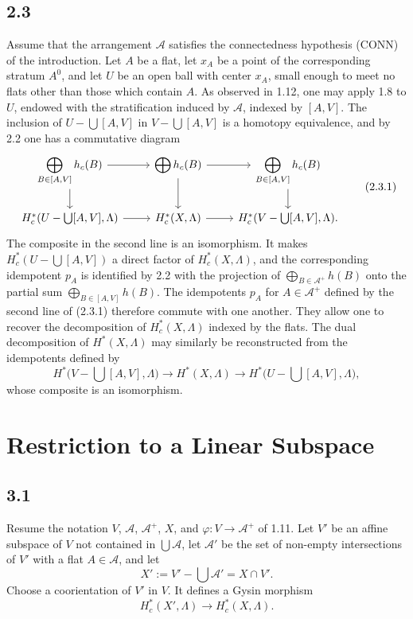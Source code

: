 \documentclass[11pt]{article}
\theoremstyle{definition}
\begin{document}
\subsection*{2.3}
Assume that the arrangement $\mathcal A$ satisfies the connectedness hypothesis \textup{(CONN)} of the introduction.  Let $A$ be a flat, let $x_A$ be a point of the corresponding stratum $A^0$, and let $U$ be an open ball with center $x_A$, small enough to meet no flats other than those which contain $A$.  As observed in 1.12, one may apply 1.8 to $U$, endowed with the stratification induced by $\mathcal A$, indexed by $[A,V]$.  The inclusion of $U-\bigcup[A,V]$ in $V-\bigcup[A,V]$ is a homotopy equivalence, and by 2.2 one has a commutative diagram
\begin{equation}
\begin{tikzcd}
\displaystyle\bigoplus_{B\in[A,V]}h_c(B) \arrow[r] \arrow[d] & \displaystyle\bigoplus h_c(B) \arrow[r] \arrow[d] & \displaystyle\bigoplus_{B\in[A,V]}h_c(B) \arrow[d]\\
H_c^*(U-\bigcup[A,V],\Lambda) \arrow[r] & H_c^*(X,\Lambda) \arrow[r] & H_c^*(V-\bigcup[A,V],\Lambda).
\end{tikzcd}\tag{2.3.1}
\end{equation}
The composite in the second line is an isomorphism.  It makes $H_c^*(U-\bigcup[A,V])$ a direct factor of $H_c^*(X,\Lambda)$, and the corresponding idempotent $p_A$ is identified by 2.2 with the projection of $\bigoplus_{B\in\mathcal A^+}h(B)$ onto the partial sum $\bigoplus_{B\in[A,V]}h(B)$.  The idempotents $p_A$ for $A\in\mathcal A^+$ defined by the second line of (2.3.1) therefore commute with one another.  They allow one to recover the decomposition of $H_c^*(X,\Lambda)$ indexed by the flats.  The dual decomposition of $H^*(X,\Lambda)$ may similarly be reconstructed from the idempotents defined by
\[
H^*\bigl(V-\bigcup[A,V],\Lambda\bigr)\longrightarrow H^*(X,\Lambda)\longrightarrow H^*\bigl(U-\bigcup[A,V],\Lambda\bigr),
\]
whose composite is an isomorphism.

\section{Restriction to a Linear Subspace}

\subsection*{3.1}
Resume the notation $V$, $\mathcal A$, $\mathcal A^+$, $X$, and $\varphi:V\to\mathcal A^+$ of 1.11.  Let $V'$ be an affine subspace of $V$ not contained in $\bigcup\mathcal A$, let $\mathcal A'$ be the set of non-empty intersections of $V'$ with a flat $A\in\mathcal A$, and let
\[
X':=V'-\bigcup\mathcal A'=X\cap V'.
\]
Choose a coorientation of $V'$ in $V$.  It defines a Gysin morphism
\begin{equation}
H_c^*(X',\Lambda)\longrightarrow H_c^*(X,\Lambda).\tag{3.1.1}
\end{equation}
\end{document}
